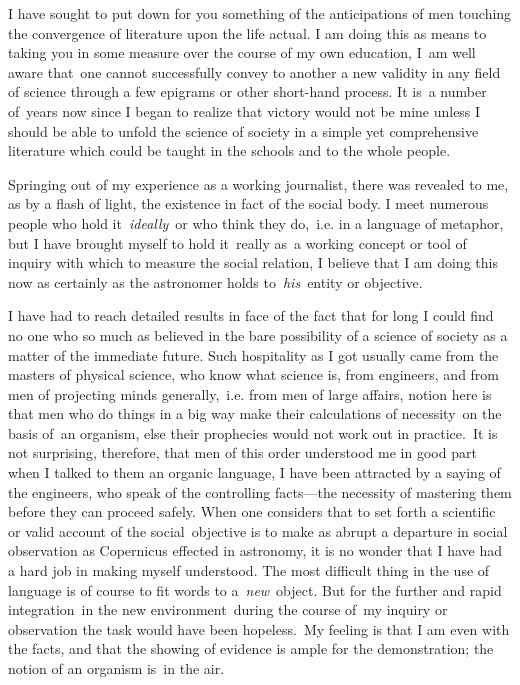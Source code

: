 \documentclass[openany,nobib]{tufte-book}
\begin{document}
I have sought to put down for you something of the anticipations of men
touching the convergence of literature upon the life actual. I am doing
this as means to taking you in some measure over the course of my own
education, I~am well aware that~one cannot successfully convey to
another a new validity in any field of science through a few epigrams or
other short-hand process. It is~a number of~years now since I began to
realize that victory would not be mine unless I should be able to unfold
the science of society in a simple yet comprehensive literature which
could be taught in the schools and to the whole people.~

Springing out of my experience as a working journalist, there was
revealed to me, as by a flash of light, the existence in fact of the
social body. I meet numerous people who hold it~\emph{ideally}~or who
think they do,~i.e. in a language of metaphor, but I have brought myself
to hold it~really as~a working concept or tool of inquiry with which to
measure the social relation, I believe that I am doing this now as
certainly as the astronomer holds to~\emph{his}~entity or objective.~

I have had to reach detailed results in face of the fact that for long I
could find no one who so much as believed in the bare possibility of a
science of society as a matter of the immediate future. Such hospitality
as I got usually came from the masters of physical science, who know
what science is, from engineers, and from men of projecting minds
generally,~i.e. from men of large affairs, notion here is that men who
do things in a big way make their calculations of necessity~on the basis
of~an organism, else their prophecies would not work out in practice.~It
is not surprising, therefore, that men of this order understood me in
good part when I talked to them an organic language, I have been
attracted by a saying of the engineers, who speak of the controlling
facts---the necessity of mastering them before they can proceed safely.
When one considers that to set forth a scientific or valid account of
the social~objective is to make as abrupt a departure in social
observation as Copernicus effected in astronomy, it is no wonder that I
have had a hard job in making myself understood. The most difficult
thing in the use of language is of course to fit words to
a~\emph{new}~object. But for the further and rapid integration~in the
new environment~during the course of~my inquiry or observation the task
would have been hopeless.~My feeling is that I am even with the facts,
and that the showing of evidence is ample for the demonstration; the
notion of an organism is~in the air.~
\end{document}
